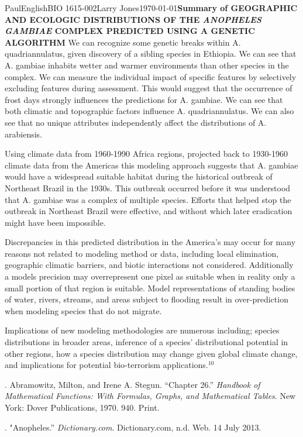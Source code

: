 \documentclass[10pt,twocolumn]{article}
\begin{document}
\begin{mla}{Paul}{English}{BIO 1615-002}{Larry Jones}{\today}{\textbf{Summary of GEOGRAPHIC AND ECOLOGIC DISTRIBUTIONS OF THE \textit{ANOPHELES GAMBIAE} COMPLEX PREDICTED USING A GENETIC ALGORITHM}}
We can recognize some genetic breaks within A. quadriannulatus, given discovery of a sibling species in Ethiopia. We can see that A. gambiae inhabits wetter and warmer environments than other species in the complex. We can measure the individual impact of specific features by selectively excluding features during assessment. This would suggest that the occurrence of frost days strongly influences the predictions for A. gambiae. We can see that both climatic and topographic factors influence A. quadriannulatus. We can also see that no unique attributes independently affect the distributions of A. arabiensis.

Using climate data from 1960-1990 Africa regions, projected back to 1930-1960 climate data from the Americas this modeling approach suggests that A. gambiae would have a widespread suitable habitat during the historical outbreak of Northeast Brazil in the 1930s. This outbreak occurred before it was understood that A. gambiae was a complex of multiple species. Efforts that helped stop the outbreak in Northeast Brazil were effective, and without which later eradication might have been impossible.

Discrepancies in this predicted distribution in the America's may occur for many reasons not related to modeling method or data, including local elimination, geographic climatic barriers, and biotic interactions not considered. Additionally a models precision may overrepresent one pixel as suitable when in reality only a small portion of that region is suitable. Model representations of standing bodies of water, rivers, streams, and areas subject to flooding result in over-prediction when modeling species that do not migrate.

Implications of new modeling methodologies are numerous including; species distributions in broader areas, inference of a species' distributional potential in other regions, how a species distribution may change given global climate change, and implications for potential bio-terrorism applications.$^{10}$


\begin{workscited}

. Abramowitz, Milton, and Irene A. Stegun. ``Chapter 26.'' \textit{Handbook of Mathematical Functions: With Formulas, Graphs, and Mathematical Tables}. New York: Dover Publications, 1970. 940. Print.

. "Anopheles.'' \textit{Dictionary.com}. Dictionary.com, n.d. Web. 14 July 2013.


\end{workscited}
\end{mla}
\end{document}
